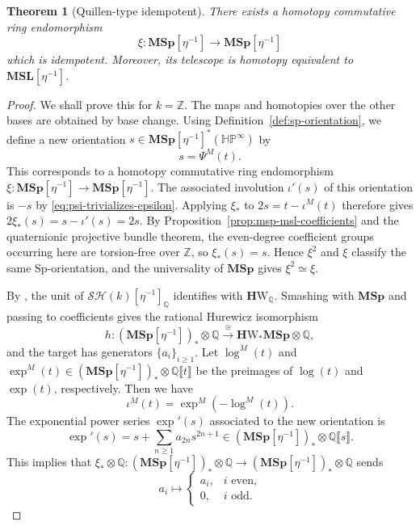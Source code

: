 \documentclass[a4paper]{amsart}
\theoremstyle{plain}
\newtheorem{theorem}[subsubsection]{Theorem}
\theoremstyle{definition}
\newcommand{\Sp}{\mathrm{Sp}}
\newcommand{\MSp}{\mathbf{MSp}}
\newcommand{\MSL}{\mathbf{MSL}}
\newcommand{\etainv}{\eta^{-1}}
\newcommand{\MSpetainv}{{\MSp[\etainv]}}
\newcommand{\MSLetainv}{{\MSL[\etainv]}}
\newcommand{\HP}{\mathbb{HP}}
\newcommand{\HPinf}{\HP^{\infty}}
\newcommand{\HW}{\mathbf{H}\mathrm{W}}
\newcommand{\SH}{\mathcal{SH}}
\newcommand{\ZZ}{\mathbb{Z}}
\newcommand{\QQ}{\mathbb{Q}}
\renewcommand{\ge}{\geqslant}
\begin{document}
\begin{theorem}[Quillen-type idempotent]\label{thm:quillen-idempotent}
	There exists a homotopy commutative ring endomorphism
	\[
		\xi:\MSpetainv\to\MSpetainv
	\]
	which is idempotent. Moreover, its telescope is homotopy equivalent to $\MSLetainv$.
\end{theorem}
\begin{proof}
	We shall prove this for $k=\ZZ$. The maps and homotopies over the other bases are obtained by base change. Using Definition~\ref{def:sp-orientation}, we define a new orientation $s \in \MSpetainv^*(\HPinf)$ by
	\[
		s = \Psi^{M}(t).
	\]
	This corresponds to a homotopy commutative ring endomorphism $\xi: \MSpetainv \to \MSpetainv$. The associated involution $\iota'(s)$ of this orientation is $-s$ by \eqref{eq:psi-trivializes-epsilon}. Applying $\xi_*$ to $2s=t-\iota^M(t)$ therefore gives $2\xi_*(s)=s-\iota'(s)=2s$. By Proposition~\ref{prop:msp-msl-coefficients} and the quaternionic projective bundle theorem, the even-degree coefficient groups occurring here are torsion-free over $\ZZ$, so $\xi_*(s)=s$. Hence $\xi^2$ and $\xi$ classify the same $\Sp$-orientation, and the universality of $\MSp$ gives $\xi^2\simeq\xi$.

	By \cite[Paragraph~5.19, Definition~6.1 and Corollary~6.2]{deglise2021on}, the unit of $\SH(k)[\etainv]_{\QQ}$ identifies with $\HW_{\QQ}$. Smashing with $\MSp$ and passing to coefficients gives the rational Hurewicz isomorphism
	\[
		h: (\MSpetainv)_*\otimes \QQ \xrightarrow{\cong} \HW_*\MSp\otimes \QQ,
	\]
	and the target has generators $\{a_i\}_{i\ge 1}$. Let $\log^{M}(t)$ and $\exp^{M}(t) \in (\MSpetainv)_*\otimes \QQ \llbracket t \rrbracket$ be the preimages of $\log(t)$ and $\exp(t)$, respectively. Then we have
	\[
		\iota^M(t) = \exp^M(-\log^M(t)).
	\]
	The exponential power series $\exp'(s)$ associated to the new orientation is
	\[
		\exp'(s) = s + \sum_{n\ge 1} a_{2n} s^{2n+1} \in (\MSpetainv)_*\otimes \QQ \llbracket s \rrbracket.
	\]
	This implies that $\xi_*\otimes \QQ: (\MSpetainv)_*\otimes \QQ \to (\MSpetainv)_*\otimes \QQ$ sends
	\[
		a_i \mapsto \begin{cases}
			a_i, & i \text{ even,} \\
			0,   & i \text{ odd.}
		\end{cases}
	\]


\end{proof}
\end{document}
